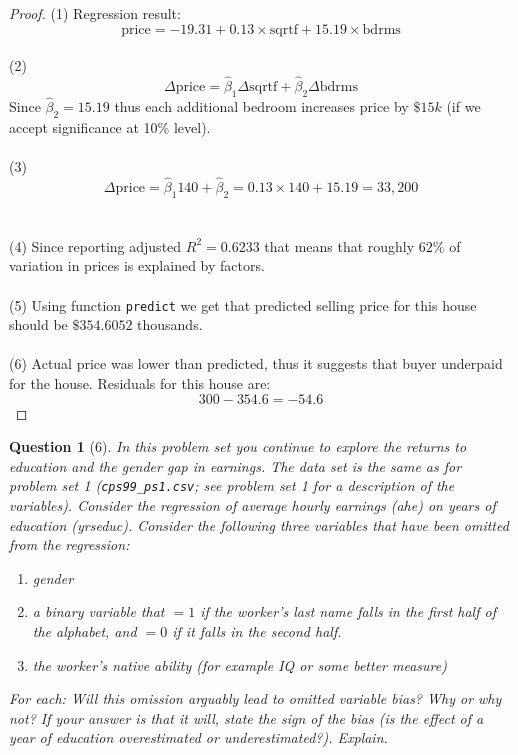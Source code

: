 \documentclass[12pt,reqno]{amsart}
\theoremstyle{plain}
\newtheorem*{theorem*}{Question}
\begin{document}
\begin{proof}
    (1) Regression result:
    \[
        \text{price} = -19.31 + 0.13 \times \text{sqrtf} + 15.19\times\text{bdrms}
    \]
    \\(2)
    \[\Delta\text{price} = \hat\beta_{1}\Delta\text{sqrtf} + \hat\beta_{2}\Delta\text{bdrms}\]
    Since $ \hat\beta_{2} = 15.19 $ thus each additional bedroom increases price by $ \$15k $
    (if we accept significance at 10\% level).
    \\\\(3)
    \[\Delta\text{price} = \hat\beta_{1}140 + \hat\beta_{2} = 0.13 \times 140 + 15.19 = 33,200 \]
    \\\\(4)
    Since reporting adjusted $ R^{2} = 0.6233 $ that means that roughly $ 62\% $ of variation in prices
    is explained by factors.
    \\\\(5)
    Using function \texttt{predict} we get that predicted selling price for this house should be $ \$354.6052 $ thousands.
    \\\\(6)
    Actual price was lower than predicted, thus it suggests that buyer underpaid for the house.
    Residuals for this house are:
    \[
        300 - 354.6 = -54.6
    \]
\end{proof}
\begin{theorem*}[6]
    \normalfont
    In this problem set you continue to explore the returns to education and the gender gap in earnings.
    The data set is the same as for problem set 1 (\texttt{cps99\_ps1.csv}; see problem set 1 for a description
    of the variables). Consider the regression of average hourly earnings (\textit{ahe}) on years of
    education (\textit{yrseduc}). Consider the following three variables that have been omitted from
    the regression:
    \begin{enumerate}
        \item \textit{gender}
        \item a binary variable that $= 1  $ if the worker’s last name falls in the first half of
              the alphabet, and $ = 0 $ if it falls in the second half.
        \item the worker’s native ability (for example \textit{IQ} or some better measure)
    \end{enumerate}
    For each: Will this omission arguably lead to omitted variable bias? Why or why not? If your
    answer is that it will, state the sign of the bias (is the effect of a year of education
    overestimated or underestimated?). Explain.
\end{theorem*}
\end{document}
